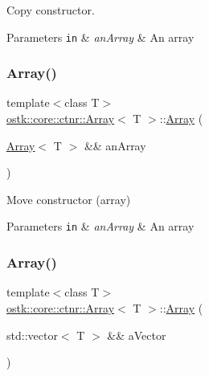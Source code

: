 Copy constructor. 


\begin{DoxyParams}[1]{Parameters}
\mbox{\tt in}  & {\em an\+Array} & An array \\
\hline
\end{DoxyParams}
\mbox{\label{classostk_1_1core_1_1ctnr_1_1_array_a2d36f4f6bf24722cef7ccbe65d2c7927}} 
\subsubsection{\texorpdfstring{Array()}{Array()}\hspace{0.1cm}{\footnotesize\ttfamily [7/8]}}
{\footnotesize\ttfamily template$<$class T$>$ \\
\hyperlink{classostk_1_1core_1_1ctnr_1_1_array}{ostk\+::core\+::ctnr\+::\+Array}$<$ T $>$\+::\hyperlink{classostk_1_1core_1_1ctnr_1_1_array}{Array} (\begin{DoxyParamCaption}\item[{\hyperlink{classostk_1_1core_1_1ctnr_1_1_array}{Array}$<$ T $>$ \&\&}]{an\+Array }\end{DoxyParamCaption})\hspace{0.3cm}{\ttfamily [default]}}



Move constructor (array) 


\begin{DoxyParams}[1]{Parameters}
\mbox{\tt in}  & {\em an\+Array} & An array \\
\hline
\end{DoxyParams}
\mbox{\label{classostk_1_1core_1_1ctnr_1_1_array_a45c08da536520aad843546a4996c3830}} 
\subsubsection{\texorpdfstring{Array()}{Array()}\hspace{0.1cm}{\footnotesize\ttfamily [8/8]}}
{\footnotesize\ttfamily template$<$class T$>$ \\
\hyperlink{classostk_1_1core_1_1ctnr_1_1_array}{ostk\+::core\+::ctnr\+::\+Array}$<$ T $>$\+::\hyperlink{classostk_1_1core_1_1ctnr_1_1_array}{Array} (\begin{DoxyParamCaption}\item[{std\+::vector$<$ T $>$ \&\&}]{a\+Vector }\end{DoxyParamCaption})}




